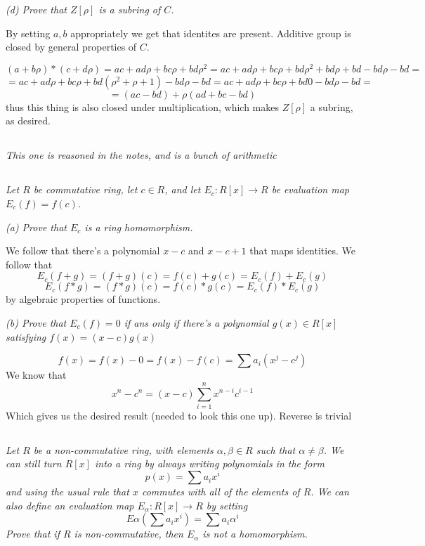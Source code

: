 \documentclass[11pt,oneside,titlepage]{book}
\begin{document}
\textit{(d) Prove that $Z[\rho] $ is a subring of $C$.}

By setting $a, b$ appropriately we get that identites are present. Additive group is
closed by general properties of $C$.

$$(a + b \rho) * (c + d \rho) = ac + ad \rho + bc \rho + bd \rho^2 =
ac + ad \rho + bc \rho + bd \rho^2 + bd \rho + bd - bd\rho - bd = $$
$$ = ac + ad \rho + bc \rho + bd (\rho^2 + \rho + 1) - bd\rho - bd =
ac + ad \rho + bc \rho + bd 0 - bd\rho - bd =$$
$$ = (ac - bd) + \rho(ad + bc - bd)$$
thus this thing is also closed under multiplication, which makes $Z[\rho]$ a
subring, as desired.

\subsection{}

\textit{This one is reasoned in the notes, and is a bunch of arithmetic}

\subsection{}

\textit{Let $R$ be commutative ring, let $c \in R$, and let $E_c: R[x]
  \to R$ be evaluation map $E_c(f) = f(c)$.}

\textit{(a) Prove that $E_c$ is a ring homomorphism.}

We follow that there's a polynomial $x - c$ and $x - c + 1$ that maps
identities.
We follow that
$$E_c(f + g) = (f + g)(c) = f(c) + g(c) = E_c(f) + E_c(g)$$
$$E_c(f * g) = (f * g)(c) = f(c) * g(c) = E_c(f) * E_c(g)$$
by algebraic properties of functions.

\textit{(b) Prove that $E_c(f) = 0$ if ans only if there's a
  polynomial $g(x) \in R[x]$ satisfying $f(x) = (x - c)g(x)$}

$$f(x) = f(x) - 0 = f(x) - f(c) = \sum{a_i (x^j - c^j)}$$
We know that
$$x^n - c^n = (x - c)\sum_{i = 1}^n{x^{n - i} c^{i - 1}}$$
Which gives us the desired result (needed to look this one up).
Reverse is trivial

\subsection{}

\textit{Let $R$ be a non-commutative ring, with elements $\alpha,
  \beta \in R$ such that $\alpha \neq \beta$. We can still turn $R[x]$
  into a ring by always writing polynomials in the form
  $$p(x) = \sum{a_i x^i}$$
  and using the usual rule that $x$ commutes with all of the elements
  of $R$.  We can also define an evaluation map $E_\alpha: R[x] \to R$
  by setting
  $$E\alpha(\sum{a_i x^i}) = \sum{a_i \alpha^i}$$
  Prove that if $R$ is non-commutative, then $E_\alpha$ is not a
  homomorphism.}
\end{document}
